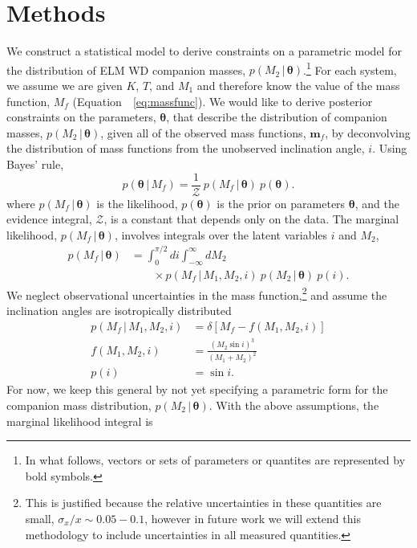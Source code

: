 \documentclass[letterpaper,12pt,preprint]{aastex}
\newcommand{\given}{\,|\,}
\newcommand{\bs}[1]{\boldsymbol{#1}}
\newcommand{\eqn}{Equation~}
\newcommand{\mf}{M_f}
\begin{document}
\section{Methods}

We construct a statistical model to derive constraints on a parametric model for the distribution of ELM WD companion masses, $p(M_2 \given \bs{\theta})$.\footnote{In what follows, vectors or sets of parameters or quantites are represented by bold symbols.} For each system, we assume we are given $K$, $T$, and $M_1$ and therefore know the value of the mass function, $\mf$ (\eqn~\ref{eq:massfunc}). We would like to derive posterior constraints on the parameters, $\bs{\theta}$, that describe the distribution of companion masses, $p(M_2\given \bs{\theta})$, given all of the observed mass functions, $\bs{m}_f$, by deconvolving the distribution of mass functions from the unobserved inclination angle, $i$. Using Bayes' rule,
\begin{equation}
    p(\bs{\theta} \given \mf) = \frac{1}{\mathcal{Z}}~p(\mf \given \bs{\theta})~p(\bs{\theta}).
\end{equation}
where $p(\mf \given \bs{\theta})$ is the likelihood, $p(\bs{\theta})$ is the prior on parameters $\bs{\theta}$, and the evidence integral, $\mathcal{Z}$, is a constant that depends only on the data. The marginal likelihood, $p(\mf \given \bs{\theta})$, involves integrals over the latent variables $i$ and $M_2$,
\begin{align}
    p(\mf \given \bs{\theta}) &= \int_0^{\pi/2} di \int_{-\infty}^\infty dM_2  \nonumber \\
      & \qquad {} \times p(\mf \given M_1, M_2, i)~p(M_2 \given \bs{\theta})~p(i).
\end{align}
We neglect observational uncertainties in the mass function,\footnote{This is justified because the relative uncertainties in these quantities are small, $\sigma_x / x \sim 0.05-0.1$, however in future work we will extend this methodology to include uncertainties in all measured quantities.} and assume the inclination angles are isotropically distributed
\begin{align}
	p(\mf \given M_1, M_2, i) &= \delta \left[\mf - f(M_1, M_2, i) \right]\\
	f(M_1, M_2, i) &= \frac{(M_2 \sin i)^3}{(M_1 + M_2)^2}\\
	p(i) &= \sin i.
\end{align}
For now, we keep this general by not yet specifying a parametric form for the companion mass distribution, $p(M_2 \given \bs{\theta})$. With the above assumptions, the marginal likelihood integral is
\end{document}
